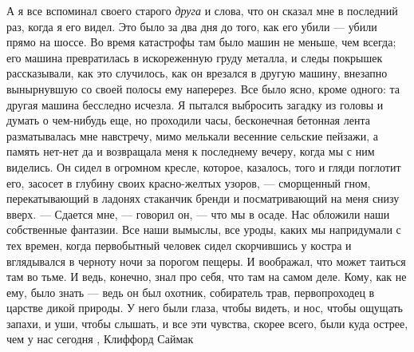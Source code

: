 А я все вспоминал своего старого \emph{друга} и слова, что он сказал мне в последний
раз, когда я его видел. Это было за два дня до того, как его убили — убили
прямо на шоссе. Во время катастрофы там было машин не меньше, чем всегда; его
машина превратилась в искореженную груду металла, и следы покрышек
рассказывали, как это случилось, как он врезался в другую машину, внезапно
вынырнувшую со своей полосы ему наперерез. Все было ясно, кроме одного: та
другая машина бесследно исчезла.  Я пытался выбросить загадку из головы и
думать о чем-нибудь еще, но проходили часы, бесконечная бетонная лента
разматывалась мне навстречу, мимо мелькали весенние сельские пейзажи, а память
нет-нет да и возвращала меня к последнему вечеру, когда мы с ним виделись.  Он
сидел в огромном кресле, которое, казалось, того и гляди поглотит его, засосет
в глубину своих красно-желтых узоров, — сморщенный гном, перекатывающий в
ладонях стаканчик бренди и посматривающий на меня снизу вверх.  — Сдается мне,
— говорил он, — что мы в осаде. Нас обложили наши собственные фантазии.  Все
наши вымыслы, все уроды, каких мы напридумали с тех времен, когда первобытный
человек сидел скорчившись у костра и вглядывался в черноту ночи за порогом
пещеры. И воображал, что может таиться там во тьме. И ведь, конечно, знал про
себя, что там на самом деле. Кому, как не ему, было знать — ведь он был
охотник, собиратель трав, первопроходец в царстве дикой природы. У него были
глаза, чтобы видеть, и нос, чтобы ощущать запахи, и уши, чтобы слышать, и все
эти чувства, скорее всего, были куда острее, чем у нас сегодня
, Клиффорд Саймак
